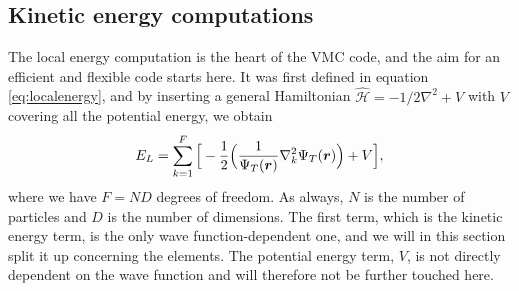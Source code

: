 \subsection{Kinetic energy computations} \label{sec:kinetic}
The local energy computation is the heart of the VMC code, and the aim for an efficient and flexible code starts here. It was first defined in equation \eqref{eq:localenergy}, and by inserting a general Hamiltonian $\hat{\mathcal{H}}=-1/2\nabla^2+V$ with $V$ covering all the potential energy, we obtain
\begin{equation}
E_L=\sum_{k=1}^F\Big[-\frac{1}{2}\Big(\frac{1}{\Psi_T(\boldsymbol{{r}})}\nabla_k^2\Psi_T(\boldsymbol{{r}})\Big) + V\Big],
\end{equation}
where we have $F=ND$ degrees of freedom. As always, $N$ is the number of particles and $D$ is the number of dimensions. The first term, which is the kinetic energy term, is the only wave function-dependent one, and we will in this section split it up concerning the elements. The potential energy term, $V$, is not directly dependent on the wave function and will therefore not be further touched here. 

